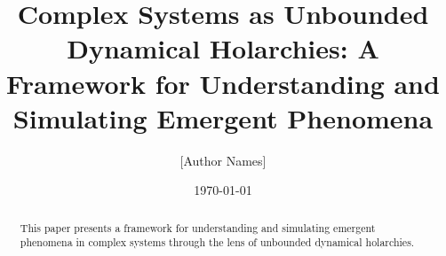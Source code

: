 \documentclass{article}
\title{Complex Systems as Unbounded Dynamical Holarchies: A Framework for Understanding and Simulating Emergent Phenomena}
\author{[Author Names]}
\date{\today}
\begin{document}
\maketitle

\begin{abstract}
This paper presents a framework for understanding and simulating emergent phenomena in complex systems through the lens of unbounded dynamical holarchies.
\end{abstract}











\end{document}

